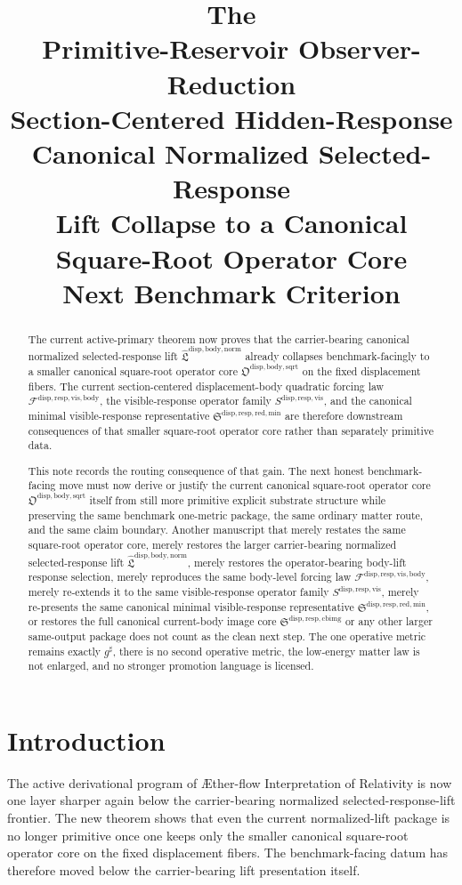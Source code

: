 \documentclass[11pt]{article}
\title{\textbf{The \TheoryName{}}\\[0.4em]
\large Primitive-Reservoir Observer-Reduction\\
\large Section-Centered Hidden-Response\\
\large Canonical Normalized Selected-Response\\
\large Lift Collapse to a Canonical\\
\large Square-Root Operator Core\\
\large Next Benchmark Criterion}
\author{}
\date{}
\newcommand{\Aflow}{\AE{}ther-flow}
\newcommand{\TheoryName}{\Aflow{} Interpretation of Relativity}
\newcommand{\CompletedMetric}{g^{\sharp}}
\newcommand{\NormalizedLiftPackage}{\widehat{\mathfrak L}^{\mathrm{disp,body,norm}}}
\newcommand{\SquareRootOperatorCore}{\mathfrak O^{\mathrm{disp,body,sqrt}}}
\newcommand{\VisibleBodyForcingLaw}{\mathscr F^{\mathrm{disp,resp,vis,body}}}
\newcommand{\VisibleResponseOperator}{S^{\mathrm{disp,resp,vis}}}
\newcommand{\MinimalReducedStructure}{\mathfrak S^{\mathrm{disp,resp,red,min}}}
\newcommand{\CurrentBodyImageCore}{\mathfrak S^{\mathrm{disp,resp,cbimg}}}
\begin{document}
\maketitle

\begin{abstract}
The current active-primary theorem now proves that the carrier-bearing canonical normalized selected-response lift \(\NormalizedLiftPackage\) already collapses benchmark-facingly to a smaller canonical square-root operator core \(\SquareRootOperatorCore\) on the fixed displacement fibers. The current section-centered displacement-body quadratic forcing law \(\VisibleBodyForcingLaw\), the visible-response operator family \(\VisibleResponseOperator\), and the canonical minimal visible-response representative \(\MinimalReducedStructure\) are therefore downstream consequences of that smaller square-root operator core rather than separately primitive data.

This note records the routing consequence of that gain. The next honest benchmark-facing move must now derive or justify the current canonical square-root operator core \(\SquareRootOperatorCore\) itself from still more primitive explicit substrate structure while preserving the same benchmark one-metric package, the same ordinary matter route, and the same claim boundary. Another manuscript that merely restates the same square-root operator core, merely restores the larger carrier-bearing normalized selected-response lift \(\NormalizedLiftPackage\), merely restores the operator-bearing body-lift response selection, merely reproduces the same body-level forcing law \(\VisibleBodyForcingLaw\), merely re-extends it to the same visible-response operator family \(\VisibleResponseOperator\), merely re-presents the same canonical minimal visible-response representative \(\MinimalReducedStructure\), or restores the full canonical current-body image core \(\CurrentBodyImageCore\) or any other larger same-output package does not count as the clean next step. The one operative metric remains exactly \(\CompletedMetric\), there is no second operative metric, the low-energy matter law is not enlarged, and no stronger promotion language is licensed.
\end{abstract}

\section{Introduction}

The active derivational program of \TheoryName{} is now one layer sharper again below the carrier-bearing normalized selected-response-lift frontier. The new theorem shows that even the current normalized-lift package is no longer primitive once one keeps only the smaller canonical square-root operator core on the fixed displacement fibers. The benchmark-facing datum has therefore moved below the carrier-bearing lift presentation itself.
\end{document}
